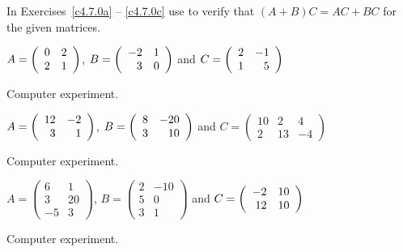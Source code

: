 \documentclass{ximera}
\begin{document}
\noindent In Exercises~\ref{c4.7.0a} -- \ref{c4.7.0c} use \Matlab to
verify that $(A+B)C = AC+BC$ for the given matrices.
\begin{computerExercise}  \label{c4.7.0a}
$A=\left(\begin{array}{rr} 0 & 2\\ 2 &1\end{array}\right)$, $B=\left(\begin{array}{rr} -2 & 1\\ 3 &0\end{array}\right)$ and $C=\left(\begin{array}{rr} 2 & -1\\ 1 &5\end{array}\right)$

\begin{solution}
Computer experiment.


\end{solution}
\end{computerExercise}
\begin{computerExercise}  \label{c4.7.0b}
$A=\left(\begin{array}{rr} 12 & -2\\ 3 &1\end{array}\right)$,
$B=\left(\begin{array}{rr} 8 & -20\\ 3 &10\end{array}\right)$ and
$C=\left(\begin{array}{rrr} 10 & 2 & 4\\ 2 & 13 & -4 \end{array}\right)$

\begin{solution}
Computer experiment.

\end{solution}
\end{computerExercise}
\begin{computerExercise}  \label{c4.7.0c}
$A=\left(\begin{array}{rr} 6 & 1 \\ 3 & 20 \\ -5 & 3\end{array}\right)$,
$B=\left(\begin{array}{rr} 2 & -10 \\ 5 & 0 \\ 3 & 1\end{array}\right)$ and
$C=\left(\begin{array}{rr} -2 & 10\\ 12 &10\end{array}\right)$

\begin{solution}
Computer experiment.

\end{solution}
\end{computerExercise}
\end{document}
